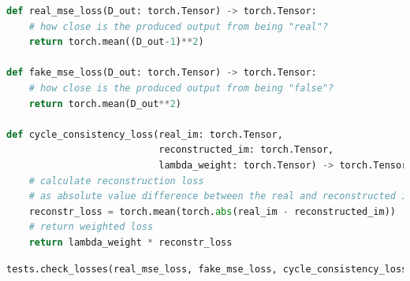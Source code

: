 \begin{lstlisting}[language=Python]
def real_mse_loss(D_out: torch.Tensor) -> torch.Tensor:
    # how close is the produced output from being "real"?
    return torch.mean((D_out-1)**2)

def fake_mse_loss(D_out: torch.Tensor) -> torch.Tensor:
    # how close is the produced output from being "false"?
    return torch.mean(D_out**2)

def cycle_consistency_loss(real_im: torch.Tensor, 
                           reconstructed_im: torch.Tensor, 
                           lambda_weight: torch.Tensor) -> torch.Tensor:
    # calculate reconstruction loss 
    # as absolute value difference between the real and reconstructed images
    reconstr_loss = torch.mean(torch.abs(real_im - reconstructed_im))
    # return weighted loss
    return lambda_weight * reconstr_loss    
\end{lstlisting}

\begin{lstlisting}[language=Python]
tests.check_losses(real_mse_loss, fake_mse_loss, cycle_consistency_loss)
\end{lstlisting}

